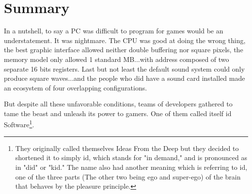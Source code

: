 \documentclass[book.tex]{subfiles}
\begin{document}
\section{Summary}
In a nutshell, to say a PC was difficult to program for games would be an understatement. It was nightmare. The CPU was good at doing the wrong thing, the best graphic interface allowed neither double buffering nor square pixels, the memory model only allowed 1 standard MB...with address composed of two separate 16 bits registers. Last but not least the default sound system could only produce square waves...and the people who did have a sound card installed made an ecosystem of four overlapping configurations.\\
\par
But despite all these unfavorable conditions, teams of developers gathered to tame the beast and unleash its power to gamers. One of them called itself id Software\footnote{They originally called themselves Ideas From the Deep but they decided to shortened it to simply id, which stands for "in demand," and is pronounced as in "did" or "kid." The name also had another meaning which is referring to id, one of the three parts (The other two being ego and super-ego) of the brain that behaves by the pleasure principle.}.
\end{document}
